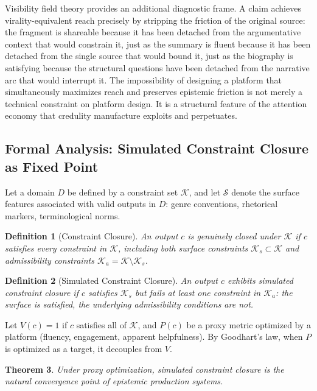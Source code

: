 \documentclass[12pt, a4paper]{article}
\newtheorem{definition}{Definition}[section]
\newtheorem{theorem}[definition]{Theorem}
\begin{document}
Visibility field theory provides an additional diagnostic frame. A claim achieves
virality-equivalent reach precisely by stripping the friction of the original source: the fragment
is shareable because it has been detached from the argumentative context that would constrain it,
just as the summary is fluent because it has been detached from the single source that would bound
it, just as the biography is satisfying because the structural questions have been detached from
the narrative arc that would interrupt it. The impossibility of designing a platform that
simultaneously maximizes reach and preserves epistemic friction is not merely a technical
constraint on platform design. It is a structural feature of the attention economy that credulity
manufacture exploits and perpetuates.

\subsection{Formal Analysis: Simulated Constraint Closure as Fixed Point}

Let a domain $D$ be defined by a constraint set $\mathcal{K}$, and let $\mathcal{S}$ denote the
surface features associated with valid outputs in $D$: genre conventions, rhetorical markers,
terminological norms.

\begin{definition}[Constraint Closure]
An output $c$ is genuinely closed under $\mathcal{K}$ if $c$ satisfies every constraint in
$\mathcal{K}$, including both surface constraints $\mathcal{K}_s \subset \mathcal{K}$ and
admissibility constraints $\mathcal{K}_a = \mathcal{K} \setminus \mathcal{K}_s$.
\end{definition}

\begin{definition}[Simulated Constraint Closure]
An output $c$ exhibits simulated constraint closure if $c$ satisfies $\mathcal{K}_s$ but fails at
least one constraint in $\mathcal{K}_a$: the surface is satisfied, the underlying admissibility
conditions are not.
\end{definition}

Let $V(c) = 1$ if $c$ satisfies all of $\mathcal{K}$, and $P(c)$ be a proxy metric optimized by
a platform (fluency, engagement, apparent helpfulness). By Goodhart's law, when $P$ is optimized
as a target, it decouples from $V$.

\begin{theorem}
Under proxy optimization, simulated constraint closure is the natural convergence point of
epistemic production systems.
\end{theorem}
\end{document}

